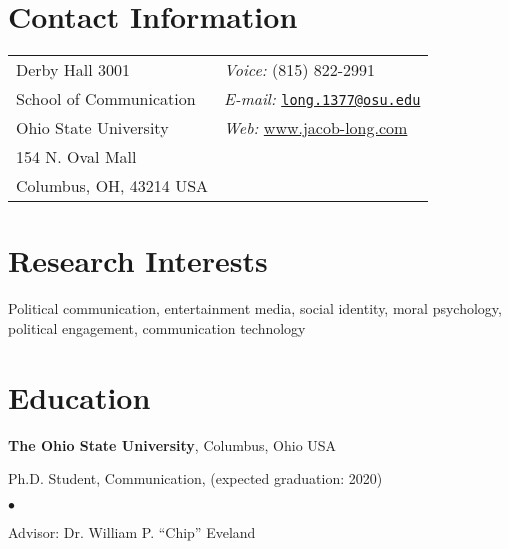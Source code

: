 \documentclass[margin,line]{res}
\newenvironment{list1}{
  \begin{list}{\ding{113}}{%
      \setlength{\itemsep}{0in}
      \setlength{\parsep}{0in} \setlength{\parskip}{0in}
      \setlength{\topsep}{0in} \setlength{\partopsep}{0in} 
      \setlength{\leftmargin}{0.17in}}}{\end{list}}
\newenvironment{list2}{
  \begin{list}{$\bullet$}{%
      \setlength{\itemsep}{0in}
      \setlength{\parsep}{0in} \setlength{\parskip}{0in}
      \setlength{\topsep}{0in} \setlength{\partopsep}{0in} 
      \setlength{\leftmargin}{0.2in}}}{\end{list}}
\begin{document}

\begin{resume}
\section{\sc Contact Information}
\vspace{.05in}
\begin{tabular}{@{}p{2in}p{4in}}
Derby Hall 3001           & {\it Voice:}  (815) 822-2991 \\            
School of Communication & {\it E-mail:}  \href{mailto:long.1377@osu.edu}{\nolinkurl{long.1377@osu.edu}}\\         
Ohio State University & {\it Web:} \href{https://www.jacob-long.com}{www.jacob-long.com}\\ 
154 N. Oval Mall \\      
Columbus, OH, 43214 USA \\     
\end{tabular}


\section{\sc Research Interests}
Political communication, entertainment media, social identity, moral psychology,\\ political engagement, communication technology

\section{\sc Education}
{\bf The Ohio State University}, Columbus, Ohio USA\\
\vspace*{-.1in}
\begin{list1}
\item[] Ph.D. Student, Communication, (expected graduation: 2020)
\begin{list2}
\vspace*{.05in}
\item Advisor: Dr. William P. ``Chip'' Eveland
\end{list2}
\end{list1}


\end{resume}
\end{document}
